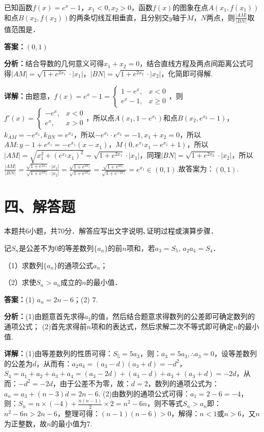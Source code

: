 \begin{question}[points=5]
已知函数$f(x)=e^x-1$，$x_1<0,x_2>0$，函数$f(x)$的图象在点$A(x_1,f(x_1))$和点$B(x_2,f(x_2))$的两条切线互相垂直，且分别交$y$轴于$M$，$N$两点，则$\frac{|AM|}{|BN|}$取值范围是．
\fillin[{$(0,1)$}]
\begin{solution}
\textbf{答案：}$(0,1)$

\textbf{分析：}结合导数的几何意义可得$x_1+x_2=0$，结合直线方程及两点间距离公式可得$|AM|=\sqrt{1+e^{2x_1}}\cdot|x_1|$，$|BN|=\sqrt{1+e^{2x_2}}\cdot|x_2|$，化简即可得解.

\textbf{详解：}由题意，$f(x)=e^x-1=\begin{cases} 1-e^x, & x<0 \\ e^x-1, & x\ge0 \end{cases}$，则$f'(x)=\begin{cases} -e^x, & x<0 \\ e^x, & x>0 \end{cases}$，所以点$A(x_1,1-e^{x_1})$和点$B(x_2,e^{x_2}-1)$，$k_{AM}=-e^{x_1},k_{BN}=e^{x_2}$，所以$-e^{x_1}\cdot e^{x_2}=-1,x_1+x_2=0$，所以$AM: y-1+e^{x_1}=-e^{x_1}(x-x_1)$，$M(0,e^{x_1}x_1-e^{x_1}+1)$，所以$|AM|=\sqrt{x_1^2+(e^{x_1}x_1)^2}=\sqrt{1+e^{2x_1}}\cdot|x_1|$，同理$|BN|=\sqrt{1+e^{2x_2}}\cdot|x_2|$，所以$\frac{|AM|}{|BN|}=\frac{\sqrt{1+e^{2x_1}}\cdot|x_1|}{\sqrt{1+e^{2x_2}}\cdot|x_2|}=\frac{\sqrt{1+e^{2x_1}}}{\sqrt{1+e^{2x_2}}}=\frac{\sqrt{1+e^{2x_1}}}{\sqrt{1+e^{-2x_1}}}=e^{x_1}\in(0,1)$.故答案为：$(0,1)$.
\end{solution}
\end{question}

\section*{四、解答题}
本题共6小题，共70分．解答应写出文字说明､证明过程或演算步骤．

\begin{question}[points=10]
记$S_n$是公差不为$0$的等差数列$\{a_n\}$的前$n$项和，若$a_3=S_5$, $a_2a_4=S_4$．

（1）求数列$\{a_n\}$的通项公式$a_n$；

（2）求使$S_n>a_n$成立的$n$的最小值．
\begin{solution}
\textbf{答案：}(1) $a_n=2n-6$；(2) $7$.

\textbf{分析：}(1)由题意首先求得$a_3$的值，然后结合题意求得数列的公差即可确定数列的通项公式； (2)首先求得前$n$项和的表达式，然后求解二次不等式即可确定$n$的最小值.

\textbf{详解：}(1)由等差数列的性质可得：$S_5=5a_3$，则：$a_3=5a_3,\therefore a_3=0$，设等差数列的公差为$d$，从而有：$a_2a_4=(a_3-d)(a_3+d)=-d^2$，$S_4=a_1+a_2+a_3+a_4=(a_3-2d)+(a_3-d)+a_3+(a_3+d)=-2d$，从而：$-d^2=-2d$，由于公差不为零，故：$d=2$，数列的通项公式为：$a_n=a_3+(n-3)d=2n-6$. (2)由数列的通项公式可得：$a_1=2-6=-4$，则：$S_n=n\times(-4)+\frac{n(n-1)}{2}\times2=n^2-6n$，则不等式$S_n>a_n$即：$n^2-6n>2n-6$，整理可得：$(n-1)(n-6)>0$，解得：$n<1$或$n>6$，又$n$为正整数，故$n$的最小值为$7$.
\end{solution}
\end{question}

